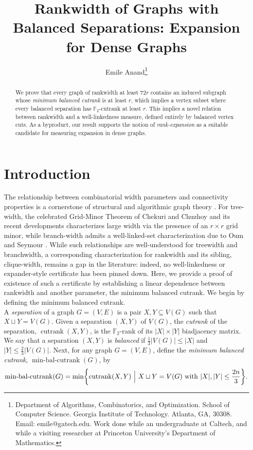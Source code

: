 \documentclass{article}
\title{\textrm{Rankwidth of Graphs with Balanced Separations: Expansion for Dense Graphs}\\}
\author{{Emile Anand}\thanks{Department of Algorithms, Combinatorics, and Optimization. School of Computer Science. Georgia Institute of Technology. Atlanta, GA, 30308. Email: \textrm{emile@gatech.edu}. Work done while an undergraduate at Caltech, and while a visiting researcher at Princeton University's Department of Mathematics.}\\}
\theoremstyle{definition}
\let\originalleft\left
\let\originalright\right
\renewcommand{\left}{\mathopen{}\mathclose\bgroup\originalleft}
\renewcommand{\right}{\aftergroup\egroup\originalright}
\begin{document}
\maketitle




\begin{abstract}
\noindent We prove that every graph of rankwidth at least $72r$ contains an induced subgraph whose \emph{minimum balanced cutrank} is at least $r$, which implies a vertex subset where every balanced separation has $\mathbb{F}_2$-cutrank at least $r$. This implies a novel relation between rankwidth and a well-linkedness measure, defined entirely by balanced vertex cuts. As a byproduct, our result supports the notion of \emph{rank-expansion} as a suitable candidate for measuring expansion in dense graphs.  
\end{abstract}



    

\section{Introduction}
  The relationship between combinatorial width parameters and connectivity properties is a cornerstone of structural and algorithmic graph theory \cite{BODLAENDER19981, SEYMOUR199322, ROBERTSON1994323, harvey2016parameterstiedtreewidth, BOTTCHER20101217}.  
For tree-width, the celebrated Grid-Minor Theorem of Chekuri and Chuzhoy \cite{10.1145/2820609} and its recent developments \cite{doi:10.1137/1.9781611977912.48, Geelen_2023} characterizes large width via the presence of an $r\times r$ grid minor, while branch-width \cite{fomin2021fastfptapproximationbranchwidth,https://doi.org/10.1002/net.20050} admits a well-linked-set characterization due to Oum and Seymour \cite{Oum_Seymour_2006}. While such relationships are well-understood for treewidth and branchwidth, a corresponding characterization for rankwidth and its sibling, clique-width, remains a gap in the literature: indeed, no well-linkedness or expander-style certificate has been pinned down. Here, we provide a proof of existence of such a certificate by establishing a linear dependence between rankwidth and another parameter, the minimum balanced cutrank. We begin by defining the minimum balanced cutrank. \\

A \emph{separation} of a graph $G=(V, E)$ is a pair $X,Y\subseteq V(G)$ such that $X\sqcup Y = V(G)$. Given a separation $(X,Y)$ of $V(G)$, the \emph{cutrank} of the separation, $\operatorname{cutrank}(X,Y)$, is the $\mathbb{F}_2$-rank of its $|X|\times|Y|$ biadjacency matrix. We say that a separation $(X,Y)$ is \emph{balanced} if $\tfrac13|V(G)|\le|X|$ and $|Y|\le\tfrac23|V(G)|$. Next, for any graph $G=(V,E)$, define the \emph{minimum balanced cutrank}, $\operatorname{min-bal-cutrank}(G)$, by
\begin{align}\operatorname{min-bal-cutrank}(G) = \min\left\{\operatorname{cutrank}(X,Y)\text{ }\Big| \text{ }X\sqcup Y = V(G)\text{ with }|X|, |Y| \leq \frac{2n}{3}\right\}. \end{align}
\end{document}

